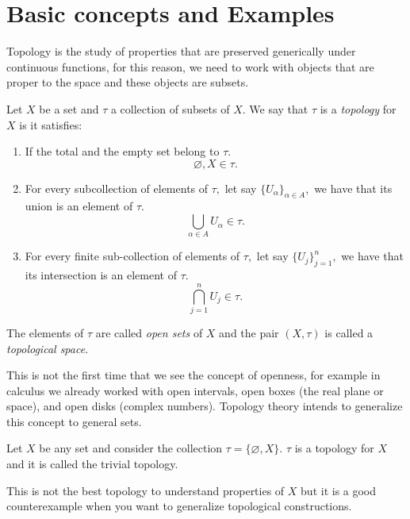 \documentclass[
	fontsize=10pt, %
	twoside=false, %
	secnumdepth=1, %
]{kaobook}
\begin{document}


\section{Basic concepts and Examples}

Topology is the study of properties that are preserved generically under continuous functions, for this reason, we need to work with objects that are proper to the space and these objects are subsets.

\begin{definition}
Let $X$ be a set and $\tau$ a collection of subsets of $X.$ We say that $\tau$ is a \emph{topology} for $X$ is it satisfies:
\begin{enumerate}
\item If the total and the empty set belong to $\tau.$ $$\varnothing, X\in\tau.$$

\item For every subcollection of elements of $\tau,$ let say $\{U_\alpha\}_{\alpha\in A},$ we have that its union is an element of $\tau.$ $$\bigcup_{\alpha \in A} U_\alpha \in \tau.$$

\item For every finite sub-collection of elements of $\tau,$ let say $\{U_j\}_{j=1}^n,$ we have that its intersection is an element of $\tau.$ $$ \bigcap_{j=1}^n U_j\in\tau.$$
\end{enumerate}

The elements of $\tau$ are called \emph{open sets} of $X$ and the pair $(X,\tau)$ is called a \emph{topological space}.
\end{definition}

This is not the first time that we see the concept of openness, for example in calculus we already worked with open intervals, open boxes (the real plane or space), and open disks (complex numbers). Topology theory intends to generalize this concept to general sets.

\begin{example}
Let $X$ be any set and consider the collection $\tau=\{\varnothing, X\}.$ $\tau$ is a topology for $X$ and it is called the trivial topology. 

This is not the best topology to understand properties of $X$ but it is a good counterexample when you want to generalize topological constructions.
\end{example}
\end{document}
